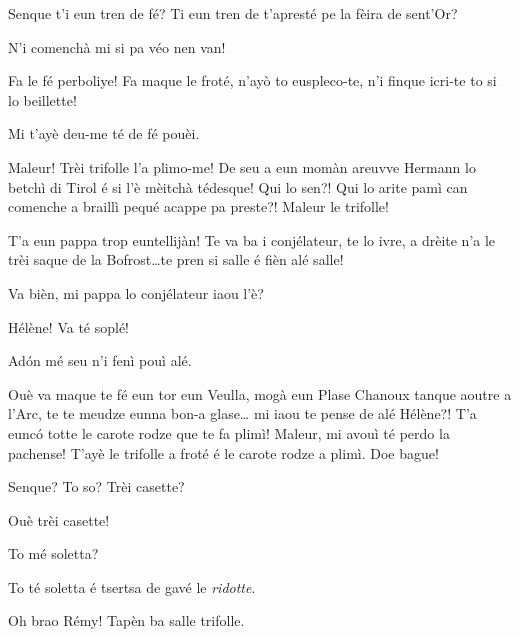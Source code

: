 \begin{drama}
\Cesarspeaks Senque t'i eun tren de fé? Ti eun tren de t'apresté pe la fèira de sent'Or?

\Helenespeaks N'i comenchà mi si pa véo nen van!

\Cesarspeaks{} Fa le fé perboliye! Fa maque le froté, n'ayò to euspleco-te, n'i finque icri-te to si lo beillette! 

\Helenespeaks Mi t'ayè deu-me té de fé pouèi.

\Cesarspeaks{} Maleur! Trèi trifolle l'a plimo-me! De seu a eun momàn areuvve Hermann lo betchì di Tirol é si l'è mèitchà tédesque! Qui lo sen?! Qui lo arite pamì can comenche a braillì pequé acappe pa preste?!  Maleur le trifolle!


\Cesarspeaks{} T'a eun pappa trop euntellijàn! Te va ba i conjélateur, te lo ivre, a drèite n'a le trèi saque de la Bofrost\ldots te pren si salle é fièn alé salle!

\Helenespeaks Va bièn, mi pappa lo conjélateur iaou l'è?

\Cesarspeaks{} Hélène! Va té soplé!

 
\Helenespeaks  Ad\'on mé seu n'i fenì pouì alé.

\Cesarspeaks{} Ouè va maque te fé eun tor eun Veulla, mogà eun Plase Chanoux tanque aoutre a l'Arc, te te meudze eunna bon-a glase\ldots {} mi iaou te pense de alé Hélène?! T'a eunc\'o totte le carote rodze que te fa plimì! Maleur, mi avouì té perdo la pachense! T'ayè le trifolle a froté é le carote rodze a plimì. Doe bague!


\Helenespeaks Senque? To so? Trèi casette?

\Cesarspeaks Ouè trèi casette!

\Helenespeaks To mé soletta?

\Cesarspeaks To té soletta é tsertsa de gavé le \textit{ridotte}.


\Cesarspeaks Oh brao Rémy! Tapèn ba salle trifolle.


\end{drama}
